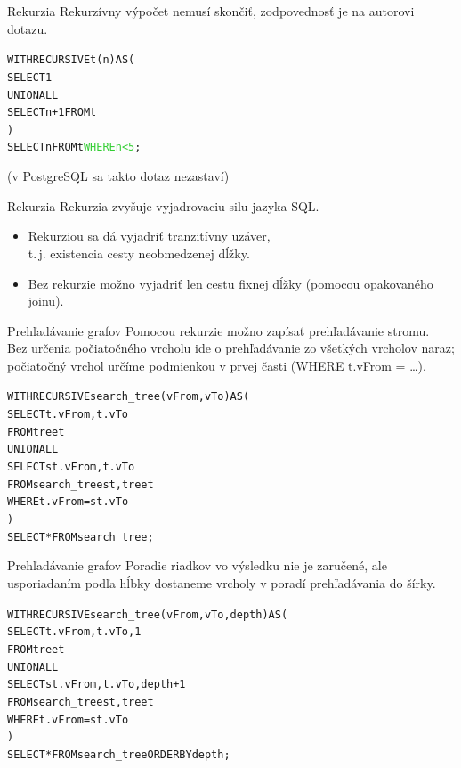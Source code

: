 \documentclass[12pt]{beamer}
\def\blue#1{\textcolor{Cerulean}{#1}}
\def\green#1{\textcolor{LimeGreen}{#1}}
\begin{document}
\begin{frame}[fragile]{Rekurzia}
Rekurzívny výpočet nemusí skončiť, zodpovednosť je na autorovi dotazu.
\bigskip

\begin{alltt}
WITH RECURSIVE t(n) AS (
    SELECT 1
  UNION ALL
    SELECT n+1 FROM t
)
SELECT n FROM t \green{WHERE n < 5};
\end{alltt}
\bigskip
(v PostgreSQL sa takto dotaz nezastaví)
\end{frame}

\begin{frame}[fragile]{Rekurzia}
Rekurzia zvyšuje vyjadrovaciu silu jazyka SQL.
\begin{itemize}
\item Rekurziou sa dá vyjadriť \blue{tranzitívny uzáver},\\ t.\,j. existencia cesty neobmedzenej dĺžky.
\item Bez rekurzie možno vyjadriť len cestu fixnej dĺžky (pomocou opakovaného joinu).
\end{itemize}
\end{frame}

\begin{frame}[fragile]{Prehľadávanie grafov}
Pomocou rekurzie možno zapísať prehľadávanie stromu.\\
Bez určenia počiatočného vrcholu ide o prehľadávanie zo všetkých vrcholov naraz; počiatočný vrchol určíme podmienkou v prvej časti (WHERE t.vFrom = \dots).\\
\bigskip

\begin{alltt}
WITH RECURSIVE \alert{search_tree}(vFrom, vTo) AS (
    SELECT t.vFrom, t.vTo
    FROM tree t
  UNION ALL
    SELECT st.vFrom, t.vTo
    FROM \alert{search_tree} st, tree t
    WHERE t.vFrom = st.vTo
)
SELECT * FROM search_tree;
\end{alltt}
\end{frame}

\begin{frame}[fragile]{Prehľadávanie grafov}
\small
Poradie riadkov vo výsledku nie je zaručené, ale usporiadaním podľa hĺbky dostaneme vrcholy v poradí \alert{prehľadávania do šírky}.
\bigskip
\begin{alltt}
WITH RECURSIVE search_tree(vFrom, vTo, \alert{depth}) AS (
    SELECT t.vFrom, t.vTo, \alert{1}
    FROM tree t
  UNION ALL
    SELECT st.vFrom, t.vTo, \alert{depth + 1}
    FROM search_tree st, tree t
    WHERE t.vFrom = st.vTo
)
SELECT * FROM search_tree \alert{ORDER BY depth};
\end{alltt}
\end{frame}
\end{document}
